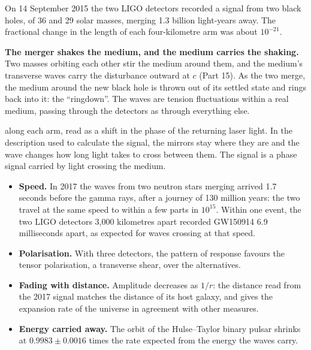 \documentclass[11pt,a4paper]{article}
\begin{document}
On 14 September 2015 the two LIGO detectors recorded a signal from two black holes, of 36 and 29 solar masses, merging 1.3 billion light-years away. The fractional change in the length of each four-kilometre arm was about $10^{-21}$.

\begin{hypbar}
\textbf{The merger shakes the medium, and the medium carries the shaking.} Two masses orbiting each other stir the medium around them, and the medium's transverse waves carry the disturbance outward at $c$ (Part 15). As the two merge, the medium around the new black hole is thrown out of its settled state and rings back into it: the ``ringdown''. The waves are tension fluctuations within a real medium, passing through the detectors as through everything else.
\end{hypbar}

 along each arm, read as a shift in the phase of the returning laser light. In the description used to calculate the signal, the mirrors stay where they are and the wave changes how long light takes to cross between them. The signal is a phase signal carried by light crossing the medium.

\begin{itemize}
\item \textbf{Speed.} In 2017 the waves from two neutron stars merging arrived 1.7 seconds before the gamma rays, after a journey of 130 million years: the two travel at the same speed to within a few parts in $10^{15}$. Within one event, the two LIGO detectors 3,000 kilometres apart recorded GW150914 6.9 milliseconds apart, as expected for waves crossing at that speed.
\item \textbf{Polarisation.} With three detectors, the pattern of response favours the tensor polarisation, a transverse shear, over the alternatives.
\item \textbf{Fading with distance.} Amplitude decreases as $1/r$: the distance read from the 2017 signal matches the distance of its host galaxy, and gives the expansion rate of the universe in agreement with other measures.
\item \textbf{Energy carried away.} The orbit of the Hulse--Taylor binary pulsar shrinks at $0.9983\pm0.0016$ times the rate expected from the energy the waves carry.
\end{itemize}
\end{document}
